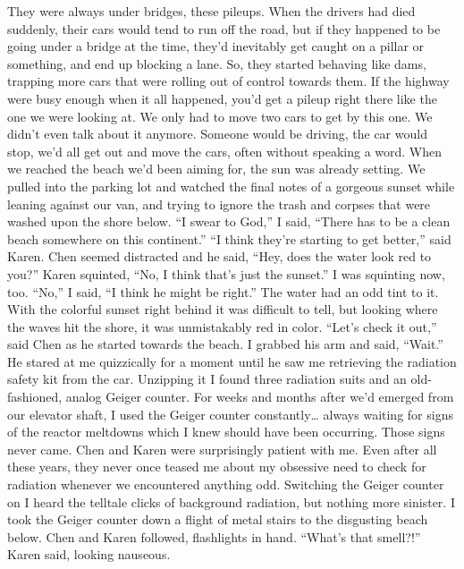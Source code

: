 \documentclass[a4paper]{article}
\begin{document}
They were always under bridges, these pileups. When the drivers had died suddenly, their cars would tend to run off the road, but if they happened to be going under a bridge at the time, they'd inevitably get caught on a pillar or something, and end up blocking a lane. So, they started behaving like dams, trapping more cars that were rolling out of control towards them. If the highway were busy enough when it all happened, you'd get a pileup right there like the one we were looking at.
We only had to move two cars to get by this one. We didn’t even talk about it anymore. Someone would be driving, the car would stop, we’d all get out and move the cars, often without speaking a word.
When we reached the beach we’d been aiming for, the sun was already setting. We pulled into the parking lot and watched the final notes of a gorgeous sunset while leaning against our van, and trying to ignore the trash and corpses that were washed upon the shore below.
“I swear to God,” I said, “There has to be a clean beach somewhere on this continent.”
“I think they’re starting to get better,” said Karen.
Chen seemed distracted and he said, “Hey, does the water look red to you?”
Karen squinted, “No, I think that’s just the sunset.”
I was squinting now, too. “No,” I said, “I think he might be right.”
The water had an odd tint to it. With the colorful sunset right behind it was difficult to tell, but looking where the waves hit the shore, it was unmistakably red in color.
“Let’s check it out,” said Chen as he started towards the beach. I grabbed his arm and said, “Wait.”
He stared at me quizzically for a moment until he saw me retrieving the radiation safety kit from the car.
Unzipping it I found three radiation suits and an old-fashioned, analog Geiger counter. For weeks and months after we’d emerged from our elevator shaft, I used the Geiger counter constantly… always waiting for signs of the reactor meltdowns which I knew should have been occurring. Those signs never came.
Chen and Karen were surprisingly patient with me. Even after all these years, they never once teased me about my obsessive need to check for radiation whenever we encountered anything odd.
Switching the Geiger counter on I heard the telltale clicks of background radiation, but nothing more sinister. I took the Geiger counter down a flight of metal stairs to the disgusting beach below. Chen and Karen followed, flashlights in hand.
“What’s that smell?!” Karen said, looking nauseous.
\end{document}
